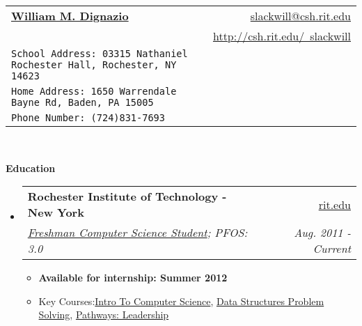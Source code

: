 \documentclass[letterpaper,11pt]{article}
\makeatletter
\newcommand{\resitem}[1]{\item #1 \vspace{-2pt}}
\newcommand{\resheading}[1]{{\large \colorbox{mygrey}{\begin{minipage}{\textwidth}{\textbf{#1 \vphantom{p\^{E}}}}\end{minipage}}}}
\newcommand{\ressubheading}[4]{
\begin{tabular*}{6.5in}{l@{\extracolsep{\fill}}r}
		\textbf{#1} & #2 \\
		\textit{#3} & \textit{#4} \\
\end{tabular*}\vspace{-6pt}}
\makeatother
\begin{document}
\newcommand{\mywebheader}{
\begin{tabular*}{7in}{l@{\extracolsep{\fill}}r}
	\textbf{\href{http://csh.rit.edu/~slackwill}{\Huge William M. Dignazio}} & \href{mailto:slackwill@csh.rit.edu}{slackwill@csh.rit.edu}\\ &
	\href{http://csh.rit.edu/~slackwill}{http://csh.rit.edu/~slackwill} \\
	{\footnotesize \texttt{{School Address: 03315 Nathaniel Rochester Hall,
Rochester, NY 14623}}} & \\
	{\footnotesize \texttt{{Home Address: 1650 Warrendale Bayne Rd, Baden, PA 15005}}} & \\
	{\footnotesize \texttt{{Phone Number: (724)831-7693}}} & 

	\end{tabular*}
\\
\vspace{0.1in}}

\mywebheader

\resheading{Education}
	\begin{itemize}
		\item
			\ressubheading{Rochester Institute of Technology - New York}{\href{http://www.rit.edu/}{rit.edu}}{\href{http://www.cs.rit.edu/}{Freshman Computer Science Student}; {PFOS: 3.0}}{Aug. 2011 - Current}
				{ \footnotesize
				\begin{itemize}
					\resitem{\textbf{Available for internship: Summer 2012}}
					\resitem{Key Courses:\href{https://register.rit.edu/courseSchedule/20111/40/03/241/05}{Intro To Computer Science}, \href{https://register.rit.edu/courseSchedule/20112/40/03/242/05}{Data Structures Problem Solving}, \href{https://register.rit.edu/courseSchedule/20112/17/20/053/03}{Pathways: Leadership}}
					
				\end{itemize}
				}
	\end{itemize} %
\end{document}
